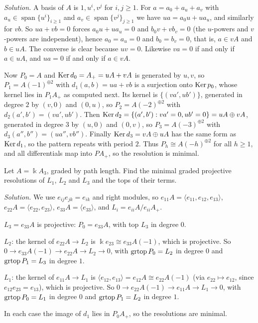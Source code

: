\begin{hidden}
\emph{Solution.}
A basis of $A$ is $1,u^i,v^j$ for $i,j\geq1$.
For $a=a_0+a_u+a_v$ with $a_u\in\operatorname{span}\{u^i\}_{i\geq1}$ and $a_v\in\operatorname{span}\{v^j\}_{j\geq1}$ we have $ua=a_0u+ua_u$, and similarly for $vb$.
So $ua+vb=0$ forces $a_0u+ua_u=0$ and $b_0v+vb_v=0$ (the $u$-powers and $v$-powers are independent), hence $a_0=a_u=0$ and $b_0=b_v=0$, that is, $a\in vA$ and $b\in uA$.
The converse is clear because $uv=0$.
Likewise $va=0$ if and only if $a\in uA$, and $ua=0$ if and only if $a\in vA$.

Now $P_0=A$ and $\operatorname{Ker}\nolimits d_0=A_+=uA+vA$ is generated by $u,v$, so $P_1=A(-1)^{\oplus2}$ with $d_1(a,b)=ua+vb$ is a surjection onto $\operatorname{Ker}\nolimits p_0$, whose kernel lies in $P_1A_+$ as computed next.
Its kernel is $\{(va',ub')\}$, generated in degree $2$ by $(v,0)$ and $(0,u)$, so $P_2=A(-2)^{\oplus2}$ with $d_2(a',b')=(va',ub')$.
Then $\operatorname{Ker}\nolimits d_2=\{(a',b'):va'=0,ub'=0\}=uA\oplus vA$, generated in degree $3$ by $(u,0)$ and $(0,v)$, so $P_3=A(-3)^{\oplus2}$ with $d_3(a'',b'')=(ua'',vb'')$.
Finally $\operatorname{Ker}\nolimits d_3=vA\oplus uA$ has the same form as $\operatorname{Ker}\nolimits d_1$, so the pattern repeats with period $2$.
Thus $P_h\cong A(-h)^{\oplus2}$ for all $h\geq1$, and all differentials map into $PA_+$, so the resolution is minimal.
\end{hidden}


\begin{exercise}
Let $A=\Bbbk A_3$, graded by path length.
Find the minimal graded projective resolutions of $L_1$, $L_2$ and $L_3$ and the tops of their terms.
\end{exercise}

\begin{hidden}
\emph{Solution.}
We use $e_{ij}e_{jk}=e_{ik}$ and right modules, so $e_{11}A=\langle e_{11},e_{12},e_{13}\rangle$, $e_{22}A=\langle e_{22},e_{23}\rangle$, $e_{33}A=\langle e_{33}\rangle$, and $L_i=e_{ii}A/e_{ii}A_+$.

$L_3=e_{33}A$ is projective: $P_0=e_{33}A$, with top $L_3$ in degree $0$.

$L_2$: the kernel of $e_{22}A\to L_2$ is $\Bbbk e_{23}\cong e_{33}A(-1)$, which is projective.
So $0\to e_{33}A(-1)\to e_{22}A\to L_2\to0$, with $\operatorname{grtop}\nolimits P_0=L_2$ in degree $0$ and $\operatorname{grtop}\nolimits P_1=L_3$ in degree $1$.

$L_1$: the kernel of $e_{11}A\to L_1$ is $\langle e_{12},e_{13}\rangle=e_{12}A\cong e_{22}A(-1)$ (via $e_{22}\mapsto e_{12}$, since $e_{12}e_{23}=e_{13}$), which is projective.
So $0\to e_{22}A(-1)\to e_{11}A\to L_1\to0$, with $\operatorname{grtop}\nolimits P_0=L_1$ in degree $0$ and $\operatorname{grtop}\nolimits P_1=L_2$ in degree $1$.

In each case the image of $d_1$ lies in $P_0A_+$, so the resolutions are minimal.
\end{hidden}


